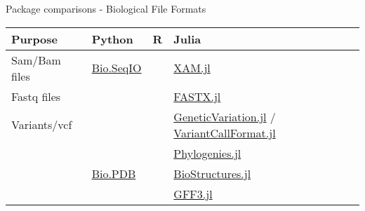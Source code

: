 \documentclass[bigger]{beamer}
\begin{document}
\begin{frame}[label={sec:orgd2716cb}]{Package comparisons - Biological File Formats}
\scriptsize
\begin{center}
\begin{tabular}{l|l|l|l|}
Purpose & Python & R & Julia\\[0pt]
\hline
Sam/Bam files & \href{https://biopython.org/wiki/SeqIO}{Bio.SeqIO} &  & \href{https://docs.juliahub.com/XAM/4JnDO/0.3.1/}{XAM.jl}\\[0pt]
Fastq files &  &  & \href{https://github.com/BioJulia/FASTX.jl}{FASTX.jl}\\[0pt]
Variants/vcf &  &  & \href{https://github.com/BioJulia/GeneticVariation.jl}{GeneticVariation.jl} / \href{https://github.com/rasmushenningsson/VariantCallFormat.jl}{VariantCallFormat.jl}\\[0pt]
 &  &  & \href{https://biojulia.dev/Phylogenies.jl/stable/}{Phylogenies.jl}\\[0pt]
 & \href{https://biopython.org/wiki/The\_Biopython\_Structural\_Bioinformatics\_FAQ}{Bio.PDB} &  & \href{https://biojulia.dev/BioStructures.jl/stable/}{BioStructures.jl}\\[0pt]
 &  &  & \href{https://github.com/BioJulia/GFF3.jl}{GFF3.jl}\\[0pt]
\end{tabular}
\end{center}

\end{frame}
\end{document}

